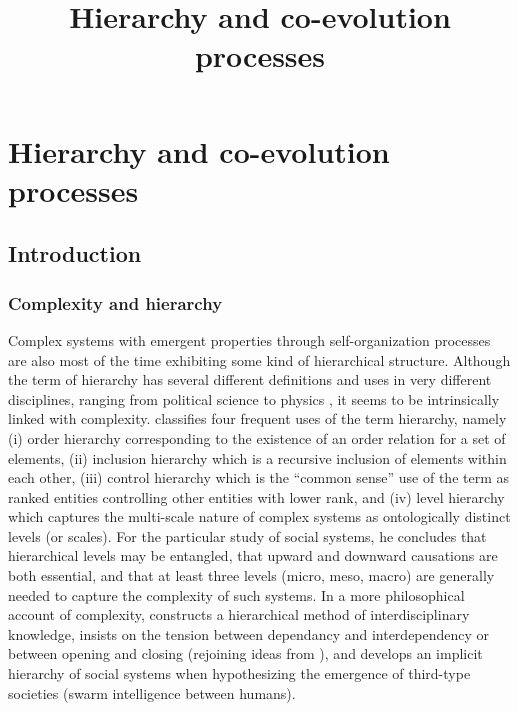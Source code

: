 \documentclass[english,fleqn,allpages]{ISTE_science}[2018/07/30]
\title{Hierarchy and co-evolution processes}
\begin{document}
\raggedbottom



\mainmatter
\chapter{Hierarchy and co-evolution processes}%
\label{chap-struct}







\section{Introduction}


\subsection{Complexity and hierarchy}

Complex systems with emergent properties through self-organization processes are also most of the time exhibiting some kind of hierarchical structure. Although the term of hierarchy has several different definitions and uses in very different disciplines, ranging from political science \citep{crumley1987dialectical} to physics \citep{10.1371/journal.pone.0033799}, it seems to be intrinsically linked with complexity. \cite{lane2006hierarchy} classifies four frequent uses of the term hierarchy, namely (i) order hierarchy corresponding to the existence of an order relation for a set of elements, (ii) inclusion hierarchy which is a recursive inclusion of elements within each other, (iii) control hierarchy which is the ``common sense'' use of the term as ranked entities controlling other entities with lower rank, and (iv) level hierarchy which captures the multi-scale nature of complex systems as ontologically distinct levels (or scales). For the particular study of social systems, he concludes that hierarchical levels may be entangled, that upward and downward causations are both essential, and that at least three levels (micro, meso, macro) are generally needed to capture the complexity of such systems. In a more philosophical account of complexity, \cite{morin1980methode} constructs a hierarchical method of interdisciplinary knowledge, insists on the tension between dependancy and interdependency or between opening and closing (rejoining ideas from \cite{holland2012signals}), and develops an implicit hierarchy of social systems when hypothesizing the emergence of third-type societies (swarm intelligence between humans).
\end{document}
